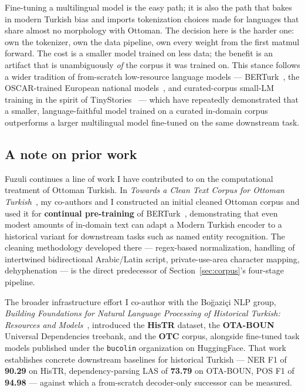 \documentclass[11pt,a4paper]{article}
\begin{document}
Fine-tuning a multilingual model is the easy path; it is also the path that
bakes in modern Turkish bias and imports tokenization choices made for
languages that share almost no morphology with Ottoman. The decision here is
the harder one: own the tokenizer, own the data pipeline, own every weight
from the first matmul forward. The cost is a smaller model trained on less
data; the benefit is an artifact that is unambiguously \emph{of} the corpus
it was trained on. This stance follows a wider tradition of from-scratch
low-resource language models --- BERTurk~\citep{schweter2020berturk}, the
OSCAR-trained European national models~\citep{suarez2019oscar}, and
curated-corpus small-LM training in the spirit of
TinyStories~\citep{eldan2023tinystories} --- which have repeatedly
demonstrated that a smaller, language-faithful model trained on a curated
in-domain corpus outperforms a larger multilingual model fine-tuned on the
same downstream task.

\subsection{A note on prior work}

Fuzuli continues a line of work I have contributed to on the computational
treatment of Ottoman Turkish. In \emph{Towards a Clean Text Corpus for
Ottoman Turkish}~\citep{karagoz2024towards}, my co-authors and I constructed
an initial cleaned Ottoman corpus and used it for \textbf{continual
pre-training} of BERTurk~\citep{schweter2020berturk}, demonstrating that
even modest amounts of in-domain text can adapt a Modern Turkish encoder to
a historical variant for downstream tasks such as named entity recognition.
The cleaning methodology developed there --- regex-based normalization,
handling of intertwined bidirectional Arabic/Latin script, private-use-area
character mapping, dehyphenation --- is the direct predecessor of
Section~\ref{sec:corpus}'s four-stage pipeline.

The broader infrastructure effort I co-author with the Boğaziçi NLP group,
\emph{Building Foundations for Natural Language Processing of Historical
Turkish: Resources and Models}~\citep{ozates2025foundations}, introduced the
\textbf{HisTR} dataset, the \textbf{OTA-BOUN} Universal Dependencies
treebank, and the \textbf{OTC} corpus, alongside fine-tuned task models
published under the \texttt{bucolin} organization on HuggingFace. That work
establishes concrete downstream baselines for historical Turkish --- NER F1
of \textbf{90.29} on HisTR, dependency-parsing LAS of \textbf{73.79} on
OTA-BOUN, POS F1 of \textbf{94.98} --- against which a from-scratch
decoder-only successor can be measured.
\end{document}
